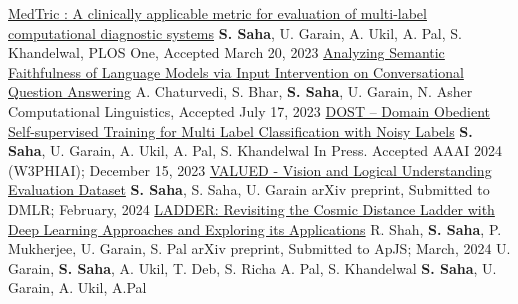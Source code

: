\documentclass[10pt,a4paper]{article}
\begin{document}
\headedsection
  { \href{https://doi.org/10.1371/journal.pone.0283895}{MedTric : A clinically applicable metric for evaluation of multi-label computational diagnostic systems}}
  {\textbf{S. Saha}, U. Garain, A. Ukil, A. Pal, S. Khandelwal,} {%
  \headedsubsection
    {PLOS One, }
    {Accepted March 20, 2023}{}
}
\vspace{0.6em}
\headedsection
  { \href{https://arxiv.org/abs/2212.10696}{Analyzing Semantic Faithfulness of Language Models via Input Intervention on Conversational Question Answering}}
  {A. Chaturvedi, S. Bhar, \textbf{S. Saha}, U. Garain, N. Asher} {%
  \headedsubsection
    {Computational Linguistics, }
    {Accepted July 17, 2023}{}
}
\vspace{0.6em}
\headedsection
  { \href{https://arxiv.org/abs/2308.05101}{DOST -- Domain Obedient Self-supervised Training for Multi Label Classification with Noisy Labels}}
  {\textbf{S. Saha}, U. Garain, A. Ukil, A. Pal, S. Khandelwal} {%
  \headedsubsection
    {In Press.}
    {Accepted AAAI 2024 (W3PHIAI);  December 15, 2023}{}
}
\vspace{0.6em}
\headedsection
  { \href{https://arxiv.org/abs/2311.12610}{VALUED - Vision and Logical Understanding Evaluation Dataset}}
  {\textbf{S. Saha}, S. Saha, U. Garain} {%
  \headedsubsection
    {arXiv preprint, }
    {Submitted to DMLR;  February, 2024}{}
}
\vspace{0.6em}
\headedsection
  { \href{https://arxiv.org/abs/2401.17029}{LADDER: Revisiting the Cosmic Distance Ladder with Deep Learning Approaches and Exploring its Applications}}
  {R. Shah, \textbf{S. Saha}, P. Mukherjee, U. Garain, S. Pal} {%
  \headedsubsection
    {arXiv preprint, }
    {Submitted to ApJS;  March, 2024}{}
}
\vspace{1em}
\spacedhrule{-0.2em}{-0.4em}
  {U. Garain, \textbf{S. Saha}, A. Ukil, T. Deb, S. Richa A. Pal, S. Khandelwal}{
  }
\vspace{2em}
  {\textbf{S. Saha}, U. Garain, A. Ukil, A.Pal}{
  }
\vspace{1em}
\spacedhrule{-0.2em}{-0.4em}
\end{document}
